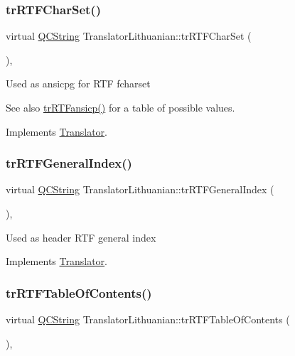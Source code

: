 \subsubsection{\texorpdfstring{trRTFCharSet()}{trRTFCharSet()}}
{\footnotesize\ttfamily virtual \mbox{\hyperlink{class_q_c_string}{Q\+C\+String}} Translator\+Lithuanian\+::tr\+R\+T\+F\+Char\+Set (\begin{DoxyParamCaption}{ }\end{DoxyParamCaption})\hspace{0.3cm}{\ttfamily [inline]}, {\ttfamily [virtual]}}

Used as ansicpg for R\+TF fcharset \begin{DoxySeeAlso}{See also}
\mbox{\hyperlink{class_translator_lithuanian_ae7d46ca0a4660dab81d90d01a2cdef6f}{tr\+R\+T\+Fansicp()}} for a table of possible values. 
\end{DoxySeeAlso}


Implements \mbox{\hyperlink{class_translator_afad391f3cbfb5ce6332b7239f8e2049a}{Translator}}.

\mbox{\label{class_translator_lithuanian_a2b4d3c436a517d9699d90210c84a988f}} 
\subsubsection{\texorpdfstring{trRTFGeneralIndex()}{trRTFGeneralIndex()}}
{\footnotesize\ttfamily virtual \mbox{\hyperlink{class_q_c_string}{Q\+C\+String}} Translator\+Lithuanian\+::tr\+R\+T\+F\+General\+Index (\begin{DoxyParamCaption}{ }\end{DoxyParamCaption})\hspace{0.3cm}{\ttfamily [inline]}, {\ttfamily [virtual]}}

Used as header R\+TF general index 

Implements \mbox{\hyperlink{class_translator}{Translator}}.

\mbox{\label{class_translator_lithuanian_afc3a6ece52d09f730c416c3dc09bf773}} 
\subsubsection{\texorpdfstring{trRTFTableOfContents()}{trRTFTableOfContents()}}
{\footnotesize\ttfamily virtual \mbox{\hyperlink{class_q_c_string}{Q\+C\+String}} Translator\+Lithuanian\+::tr\+R\+T\+F\+Table\+Of\+Contents (\begin{DoxyParamCaption}{ }\end{DoxyParamCaption})\hspace{0.3cm}{\ttfamily [inline]}, {\ttfamily [virtual]}}

